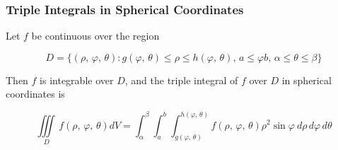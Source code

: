 \subsubsection{Triple Integrals in Spherical Coordinates}
Let $f$ be continuous over the region

\begin{equation}
    D = \{ (\rho,\, \varphi,\, \theta): g(\varphi,\, \theta) \leq \rho \leq h(\varphi,\, \theta),\, a \leq \varphi b,\, \alpha \leq \theta \leq \beta \}
\end{equation}

Then $f$ is integrable over $D$, and the triple integral of $f$ over $D$ in spherical coordinates is

\begin{equation}
    \iiint \limits _D \, f(\rho,\, \varphi,\, \theta) dV = \int _\alpha ^\beta \int _a ^b \int _{g(\varphi,\, \theta)} ^{h(\varphi,\, \theta)} f(\rho,\, \varphi,\, \theta) \rho^2 \sin \varphi \ d\rho\, d\varphi\, d\theta
\end{equation}
